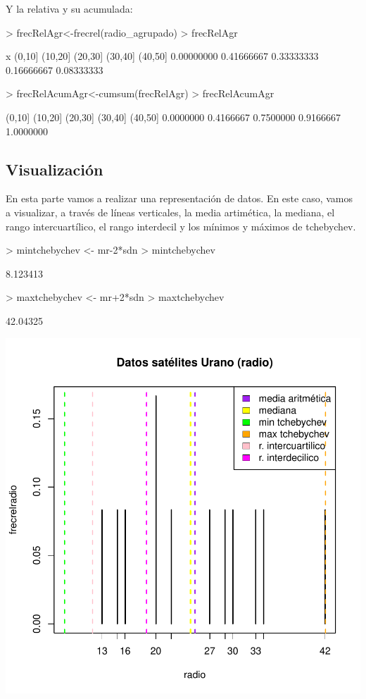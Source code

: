 \documentclass [a4paper] {article}
\begin{document}
Y la relativa y su acumulada:

\begin{Schunk}
\begin{Sinput}
> frecRelAgr<-frecrel(radio_agrupado)
> frecRelAgr
\end{Sinput}
\begin{Soutput}
x
    (0,10]    (10,20]    (20,30]    (30,40]    (40,50] 
0.00000000 0.41666667 0.33333333 0.16666667 0.08333333 
\end{Soutput}
\begin{Sinput}
> frecRelAcumAgr<-cumsum(frecRelAgr)
> frecRelAcumAgr
\end{Sinput}
\begin{Soutput}
   (0,10]   (10,20]   (20,30]   (30,40]   (40,50] 
0.0000000 0.4166667 0.7500000 0.9166667 1.0000000 
\end{Soutput}
\end{Schunk}


\subsection{Visualización}
En esta parte vamos a realizar una representación de datos. En este caso, vamos a visualizar, a través de líneas
verticales, la media artimética, la mediana, el rango intercuartílico, el rango interdecil y los mínimos y máximos de tchebychev.

\begin{Schunk}
\begin{Sinput}
> mintchebychev <- mr-2*sdn
> mintchebychev
\end{Sinput}
\begin{Soutput}
[1] 8.123413
\end{Soutput}
\begin{Sinput}
> maxtchebychev <- mr+2*sdn
> maxtchebychev
\end{Sinput}
\begin{Soutput}
[1] 42.04325
\end{Soutput}
\end{Schunk}
\includegraphics{Memoria-Figura 1}
\end{document}
